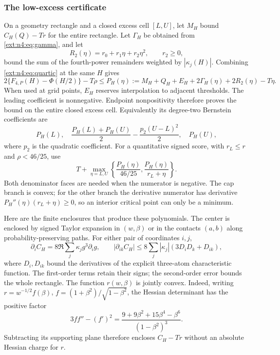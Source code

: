 \subsubsection{The low-excess certificate}
On a geometry rectangle and a closed excess cell $[L,U]$, let
$M_H$ bound $C_H(Q)-Tr$ for the entire rectangle. Let
$\Gamma_H$ be obtained from \eqref{ext:n4:eq:gamma}, and let
\[
 R_2(\eta)=r_0+r_1\eta+r_2\eta^2,\qquad r_2\ge0,
\]
bound the sum of the fourth-power remainders weighted by
$|\kappa_j(H)|$. Combining \eqref{ext:n4:eq:quartic} at the same
$H$ gives
\begin{equation}\label{ext:n4:eq:low-polynomial}
 2\{F_{4,P}(H)-\Phi(H/2)\}-T\rho
 \le P_H(\eta):=M_H+Q_H+E_H+2\Gamma_H(\eta)+2R_2(\eta)-T\eta.
\end{equation}
When used at grid points, $E_H$ reserves interpolation to adjacent
thresholds. The leading coefficient is nonnegative. Endpoint
nonpositivity therefore proves the bound on the entire closed excess
cell. Equivalently its degree-two Bernstein coefficients are
\[
 P_H(L),\quad
 \frac{P_H(L)+P_H(U)}2-\frac{p_2(U-L)^2}{2},\quad P_H(U),
\]
where $p_2$ is the quadratic coefficient. For a quantitative signed
score, with $r_L\le r$ and $\rho<46/25$, use
\[
 T+\max_{\eta=L,U}
 \left\{\frac{P_H(\eta)}{46/25},
        \frac{P_H(\eta)}{r_L+\eta}\right\}.
\]
Both denominator faces are needed when the numerator is negative.
The cap branch is convex; for the other branch the derivative
numerator has derivative $P_H''(\eta)(r_L+\eta)\ge0$, so an
interior critical point can only be a minimum.

Here are the finite enclosures that produce these polynomials.
The center is enclosed by signed Taylor expansion in $(w,\beta)$
or in the contacts $(a,b)$ along probability-preserving paths.
For either pair of coordinates $i,j$,
\[
 \partial_i C_H=8\Re\sum_j\kappa_jg^3\partial_i g,\qquad
 |\partial_{ik}C_H|\le8\sum_j|\kappa_j|
       (3D_iD_k+D_{ik}),
\]
where $D_i,D_{ik}$ bound the derivatives of the explicit
three-atom characteristic function. The first-order terms retain
their signs; the second-order error bounds the whole rectangle.
The function $r(w,\beta)$ is jointly convex. Indeed, writing
$r=w^{-1/2}f(\beta)$, $f=(1+\beta^2)/\sqrt{1-\beta^2}$,
the Hessian determinant has the positive factor
\[
 3ff''-(f')^2=
 \frac{9+9\beta^2+15\beta^4-\beta^6}{(1-\beta^2)^3}.
\]
Subtracting its supporting plane therefore encloses $C_H-Tr$
without an absolute Hessian charge for $r$.

